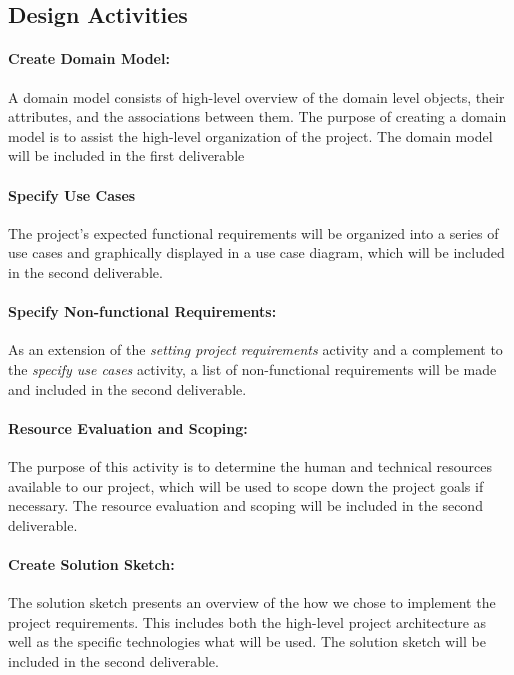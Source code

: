 \documentclass[12pt]{article}
\begin{document}
\subsection*{Design Activities}

\paragraph*{Create Domain Model:}A domain model consists of high-level overview of the domain level objects, their attributes, and the associations between them. The purpose of creating a domain model is to assist the high-level organization of the project. The domain model will be included in the first deliverable

\paragraph*{Specify Use Cases}The project's expected functional requirements will be organized into a series of use cases and graphically displayed in a use case diagram, which will be included in the second deliverable.

\paragraph*{Specify Non-functional Requirements:}As an extension of the \emph{setting project requirements} activity and a complement to the \emph{specify use cases} activity, a list of non-functional requirements will be made and included in the second deliverable.

\paragraph*{Resource Evaluation and Scoping:}The purpose of this activity is to determine the human and technical resources available to our project, which will be used to scope down the project goals if necessary. The resource evaluation and scoping will be included in the second deliverable.

\paragraph*{Create Solution Sketch:}The solution sketch presents an overview of the how we chose to implement the project requirements. This includes both the high-level project architecture as well as the specific technologies what will be used. The solution sketch will be included in the second deliverable.
\end{document}
